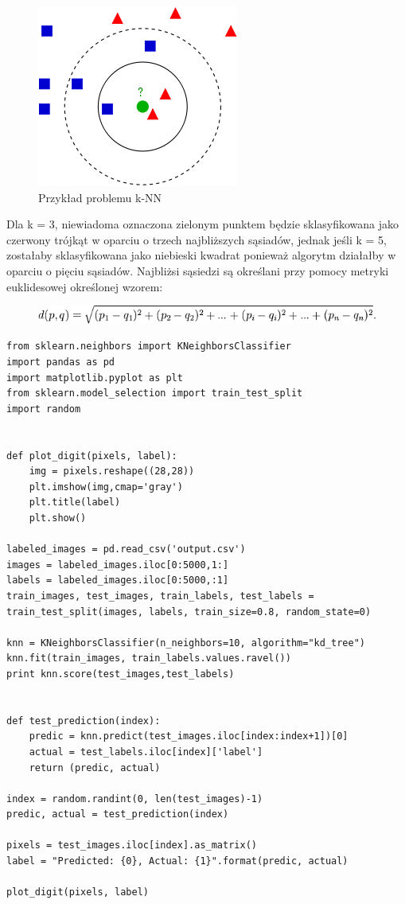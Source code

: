 \documentclass[brudnopis]{xmgr}
\begin{document}
\begin{figure}[!tbh]
\centering
\includegraphics[width=.6\hsize]{fig/knn}
\caption{Przykład problemu k-NN}
\end{figure}
\newpage
Dla k = 3, niewiadoma oznaczona zielonym punktem będzie sklasyfikowana jako czerwony trójkąt w oparciu o trzech najbliższych sąsiadów, jednak jeśli k = 5, zostałaby sklasyfikowana jako niebieski kwadrat ponieważ algorytm działałby w oparciu o pięciu sąsiadów. Najbliżsi sąsiedzi są określani przy pomocy metryki euklidesowej określonej wzorem:

\begin{figure}[!tbh]
\centering
\includegraphics[width=.8\hsize]{fig/knn-wzor}
\end{figure}

\lstset{language=Python} 
\begin{lstlisting}
from sklearn.neighbors import KNeighborsClassifier
import pandas as pd
import matplotlib.pyplot as plt
from sklearn.model_selection import train_test_split
import random


def plot_digit(pixels, label):
    img = pixels.reshape((28,28))
    plt.imshow(img,cmap='gray')
    plt.title(label)
    plt.show()

labeled_images = pd.read_csv('output.csv')
images = labeled_images.iloc[0:5000,1:]
labels = labeled_images.iloc[0:5000,:1]
train_images, test_images, train_labels, test_labels = train_test_split(images, labels, train_size=0.8, random_state=0)

knn = KNeighborsClassifier(n_neighbors=10, algorithm="kd_tree")
knn.fit(train_images, train_labels.values.ravel())
print knn.score(test_images,test_labels)


def test_prediction(index):
    predic = knn.predict(test_images.iloc[index:index+1])[0]
    actual = test_labels.iloc[index]['label']
    return (predic, actual)

index = random.randint(0, len(test_images)-1)
predic, actual = test_prediction(index)

pixels = test_images.iloc[index].as_matrix()
label = "Predicted: {0}, Actual: {1}".format(predic, actual)

plot_digit(pixels, label)
\end{lstlisting}
\end{document}
